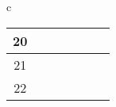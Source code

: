 \begin{longtable}{c}
{\begin{tabular}{cllllcc}
	\multicolumn{1}{|c|}{20}          & \multicolumn{1}{l|}{}           & \multicolumn{1}{l|}{}                                                                                                                                                                                             & \multicolumn{1}{l|}{}                                                                                                                                     & \multicolumn{1}{l|}{}                                                                                                                                                                                                                & \multicolumn{1}{c|}{}                                                                                & \multicolumn{1}{c|}{}                                                                                 \\ \hline
	\multicolumn{1}{|c|}{21}          & \multicolumn{1}{l|}{}           & \multicolumn{1}{l|}{}                                                                                                                                                                                             & \multicolumn{1}{l|}{}                                                                                                                                     & \multicolumn{1}{l|}{}                                                                                                                                                                                                                & \multicolumn{1}{c|}{}                                                                                & \multicolumn{1}{c|}{}                                                                                 \\ \hline
	\multicolumn{1}{|c|}{22}          & \multicolumn{1}{l|}{}           & \multicolumn{1}{l|}{}                                                                                                                                                                                             & \multicolumn{1}{l|}{}                                                                                                                                     & \multicolumn{1}{l|}{}                                                                                                                                                                                                                & \multicolumn{1}{c|}{}                                                                                & \multicolumn{1}{c|}{}                                                                                 \\ \hline

\end{tabular}}
\end{longtable}
